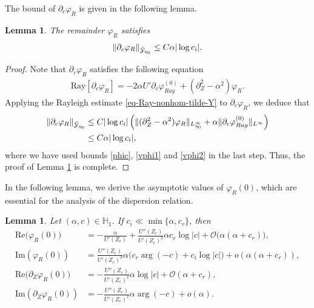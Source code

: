 \documentclass[reqno,11pt]{amsart}
\numberwithin{equation}{section}
\numberwithin{equation}{section}
\theoremstyle{plain}
\newtheorem{lemma}[theorem]{Lemma}
\begin{document}
	The bound of $\partial_c\varphi_R$ is given in the following lemma.
	\begin{lemma}\label{lmphir}	
		The remainder $\varphi_{R}$ satisfies
		\begin{align}
			\|\partial_c\varphi_R\|_{\Tilde{\mathcal{Y}}_{\eta_0}}\leq C\alpha|\log c_i|.\label{phir}
		\end{align}
	\end{lemma}
	\begin{proof}
		Note that $\partial_c\varphi_R$ satisfies the following equation
		\begin{align}\nonumber
			\mathrm{Ray}[\partial_c\varphi_R]=-2\alpha U'\partial_c\varphi_{Ray}^{(0)}+(\partial_Z^2-\alpha^2)\varphi_R.	
		\end{align}
		Applying the Rayleigh estimate \eqref{eq-Ray-nonhom-tilde-Y} to $\partial_c\varphi_R$, we deduce that
		\begin{align}
			\|\partial_c\varphi_R\|_{\Tilde{\mathcal{Y}}_{\eta_0}}&\leq C|\log c_i|\left(\|(\partial_Z^2-\alpha^2)\varphi_R\|_{L^\infty_{\eta_0}}+\alpha\|\partial_c\varphi_{Ray}^{(0)}\|_{L^\infty}	\right)\nonumber\\
			&\leq C\alpha |\log c_i|,\nonumber
		\end{align}
		where we have used bounds \eqref{phic}, \eqref{vphi1} and \eqref{vphi2} in the last step. Thus, the proof of Lemma \ref{lmphir} is complete.
	\end{proof}
	In the following lemma, we derive the asymptotic values of $\varphi_{R}(0)$, which are essential for the analysis of the dispersion relation.
				
				\begin{lemma}\label{lem:ray-R-asy}
					Let $(\alpha,c)\in \mathbb{H}_1$. If $c_i\ll \min\{\alpha, c_r\}$, then
					\begin{align}
						\mathrm{Re}\big(\varphi_R(0)\big) &= -\frac{\alpha}{U'(Z_c)}+\frac{U''(Z_c)}{U'(Z_c)^3} \alpha c_r\log|c|+\mathcal{O}\big(\alpha (\alpha+c_r)\big),\label{r1}\\
						\mathrm{Im}\left(\varphi_{R}(0)\right)&=\frac{ U''(Z_c)}{U'(Z_c)^3}
						\alpha\big(c_r\arg(-c)+c_i\log|c|\big)+o(\alpha (\alpha+c_r)),\label{r2}\\
						\mathrm{Re}\big(\partial_Z\varphi_R(0)\big)&=-\frac{U''(Z_c)}{U'(Z_c)^2}\alpha \log|c|+\mathcal{O}(\alpha+c_r),\label{r3}\\
						\mathrm{Im}\left(\partial_Z\varphi_{R}(0) \right)&=-\frac{ U''(Z_c)}{U'(Z_c)^2}\alpha\arg(-c) +o(\alpha).\label{r4}
					\end{align}
				\end{lemma}
				
\end{document}
